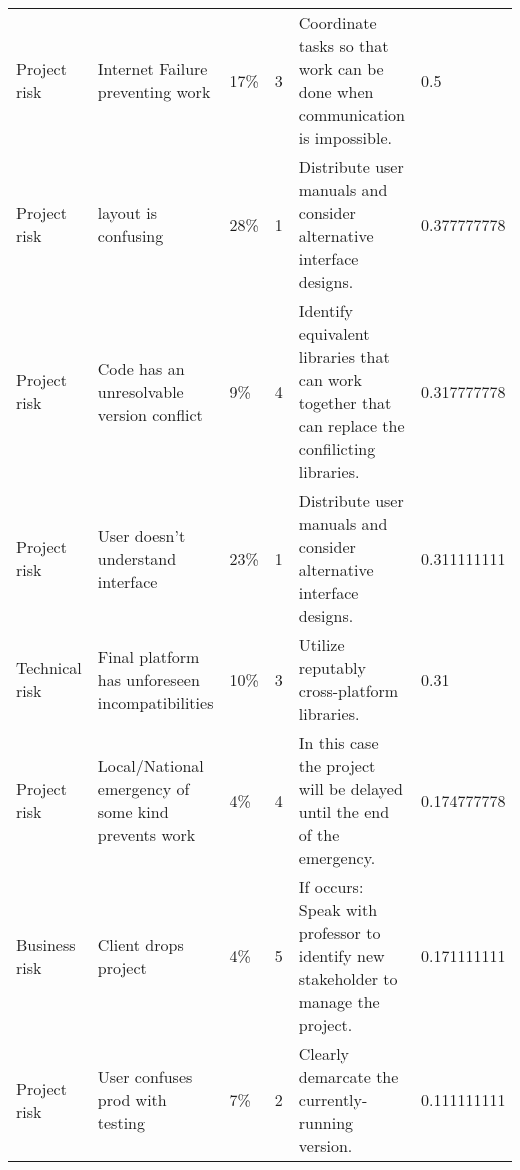 \documentclass{article}
\begin{document}
\begin{table}[]
\begin{tabular}{llllll}
    Project risk   & Internet Failure preventing work                      & 17\%        & 3      & Coordinate tasks so that work can be done when communication is impossible.                                                                                                      & 0.5           \\
    Project risk   & layout is confusing                                   & 28\%        & 1      & Distribute user manuals and consider alternative interface designs.                                                                                                              & 0.377777778   \\
    Project risk   & Code has an unresolvable version conflict             & 9\%         & 4      & Identify equivalent libraries that can work together that can replace the confilicting libraries.                                                                                & 0.317777778   \\
    Project risk   & User doesn't understand interface                     & 23\%        & 1      & Distribute user manuals and consider alternative interface designs.                                                                                                              & 0.311111111   \\
    Technical risk & Final platform has unforeseen incompatibilities       & 10\%        & 3      & Utilize reputably cross-platform libraries.                                                                                                                                      & 0.31          \\
    Project risk   & Local/National emergency of some kind prevents work   & 4\%         & 4      & In this case the project will be delayed until the end of the emergency.                                                                                                         & 0.174777778   \\
    Business risk  & Client drops project                                  & 4\%         & 5      & If occurs: Speak with professor to identify new stakeholder to manage the project.                                                                                               & 0.171111111   \\
    Project risk   & User confuses prod with testing                       & 7\%         & 2      & Clearly demarcate the currently-running version.                                                                                                                                 & 0.111111111   \\

\end{tabular}
\end{table}
\end{document}
